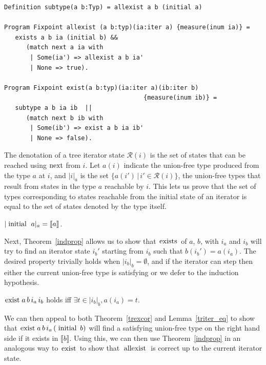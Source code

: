 \documentclass[a4paper,english]{lipics-v2019}
\newcommand{\denotes}[1]{\llbracket #1 \rrbracket}
\renewcommand{\c}[1]{\ensuremath{\text{\lstinline{#1}}}\xspace}
\begin{document}
\begin{lstlisting}
Definition subtype(a b:Typ) = allexist a b (initial a)

Program Fixpoint allexist (a b:typ)(ia:iter a) {measure(inum ia)} =
   exists a b ia (initial b) && 
      (match next a ia with 
       | Some(ia') => allexist a b ia' 
       | None => true).

Program Fixpoint exist(a b:typ)(ia:iter a)(ib:iter b)
                                      {measure(inum ib)} =
   subtype a b ia ib  || 
      (match next b ib with 
       | Some(ib') => exist a b ia ib' 
       | None => false).
\end{lstlisting}

\newcommand{\irdn}[1]{\ensuremath{\mathcal{R}({#1})}}
\newcommand{\irch}[2]{\ensuremath{|#1|_{#2}}}

\noindent
The denotation of a tree iterator state $\irdn{i}$ is the set of states that
can be reached using \c{next} from $i$. Let $a(i)$ indicate the union-free
type produced from the type $a$ at $i$, and \irch{i}{a} is the set
$\{a(i')\,|\,i'\in\irdn{i}\}$, the union-free types that result from states
in the type $a$ reachable by $i$.  This lets us prove that the set of types
corresponding to states reachable from the initial state of an iterator is
equal to the set of states denoted by the type itself.

\begin{lemma}\label{triter_eq}
$\irch{\c{initial}~a}{a} = \denotes{a}$.
\end{lemma}

\noindent
Next, Theorem~\ref{indprop} allows us to show that \c{exists} of $a$, $b$,
with $i_a$ and $i_b$ will try to find an iterator state $i_b'$ starting from
$i_b$ such that $b(i_b') = a(i_a)$. The desired property trivially holds
when $\irch{i_b}{b} = \emptyset$, and if the iterator can step then either
the current union-free type is satisfying or we defer to the induction
hypothesis.


\begin{theorem}\label{trexcor}
$\c{exist}\,a\,b\,i_a\,i_b$ holds iff $\exists t\in\irch{i_b}{b},a(i_a)= t$.
\end{theorem}

\noindent
We can then appeal to both Theorem~\ref{trexcor} and Lemma~\ref{triter_eq}
to show that $\c{exist}\,a\,b\,i_a\,(\c{initial}\,b)$ will find a satisfying
union-free type on the right hand side if it exists in $\denotes{b}$. Using
this, we can then use Theorem~\ref{indprop} in an analogous way to \c{exist}
to show that \c{allexist} is correct up to the current iterator state.
\end{document}
